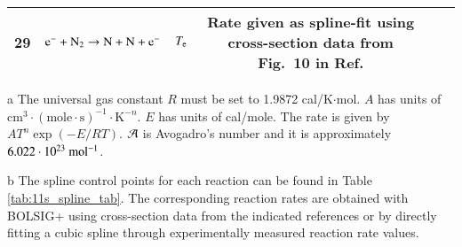 \documentclass{warpdoc}
\begin{document}
\begin{table}[t]
\begin{center}
\begin{threeparttable}
\begin{tabular}{cccccccc}
29 & $\rm e^{-} +N_2\rightarrow N + N + e^{-}$ &$T_{\rm e}$ & \multicolumn{3}{p{8cm}}{Rate given as spline-fit using cross-section data from Fig.~10 in Ref. \cite{pr:1985;:phelps}}  
                                               & \cite{pr:1985;:phelps} \\
                                                                                                                           
\bottomrule
\end{tabular}
\begin{tablenotes}
\item[{a}] The universal gas constant $R$ must be set to 1.9872	cal/K$\cdot$mol. $A$ has units of $\textrm{cm}^3\cdot(\textrm{mole}\cdot \textrm{s})^{-1}\cdot \textrm{K}^{-n}$. $E$ has units of cal/mole. The rate is given by $A T^n \exp(-E/RT)$. ${\cal A}$ is Avogadro's number and it is approximately $6.022 \cdot 10^{23}~{\rm mol^{-1}}$.
\item[{b}] The spline control points for each reaction can be found in Table \ref{tab:11s_spline_tab}. The corresponding reaction rates are obtained with BOLSIG+ using cross-section data from the indicated references or by directly fitting a cubic spline through experimentally measured reaction rate values.
\end{tablenotes}
\label{tab:rodriguez2024b}
\end{threeparttable}
\end{center}
\end{table}
%
\end{document}
